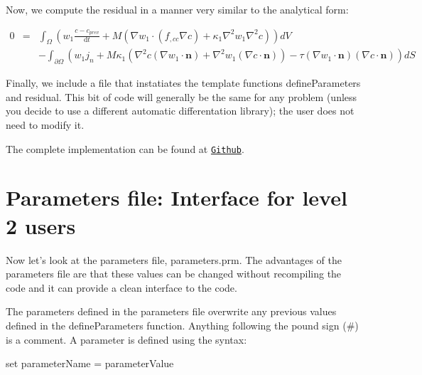 Now, we compute the residual in a manner very similar to the analytical form\-:

\begin{eqnarray*} 0 &=& \int_\Omega \left(w_1\frac{c - c_{prev}}{\mathrm{d}t} + M\left(\nabla w_1\cdot(f_{,cc}\nabla c) + \kappa_1\nabla^2 w_1\nabla^2 c\right)\right) dV\\ &\phantom{=}& - \int_{\partial\Omega} \left(w_1j_n + M\kappa_1\left(\nabla^2c(\nabla w_1\cdot\boldsymbol{n}) + \nabla^2w_1(\nabla c\cdot\boldsymbol{n})\right) - \tau(\nabla w_1\cdot\boldsymbol{n})(\nabla c\cdot\boldsymbol{n})\right) dS \end{eqnarray*}


\begin{DoxyCodeInclude}

\end{DoxyCodeInclude}


Finally, we include a file that instatiates the template functions {\ttfamily define\-Parameters} and {\ttfamily residual}. This bit of code will generally be the same for any problem (unless you decide to use a different automatic differentation library); the user does not need to modify it.


\begin{DoxyCodeInclude}

\end{DoxyCodeInclude}


The complete implementation can be found at \href{https://github.com/mechanoChem/mechanoChemIGA/blob/master/initBounValProbs/CahnHilliard_oneSpecies/2D/userFunctions.cc}{\tt Github}.

\section*{Parameters file\-: Interface for level 2 users }

Now let's look at the parameters file, {\ttfamily parameters.\-prm}. The advantages of the parameters file are that these values can be changed without recompiling the code and it can provide a clean interface to the code. 

The parameters defined in the parameters file overwrite any previous values defined in the {\ttfamily define\-Parameters} function. Anything following the pound sign (\#) is a comment. A parameter is defined using the syntax\-:

{\ttfamily set} {\ttfamily parameter\-Name} {\ttfamily =} {\ttfamily parameter\-Value} 

